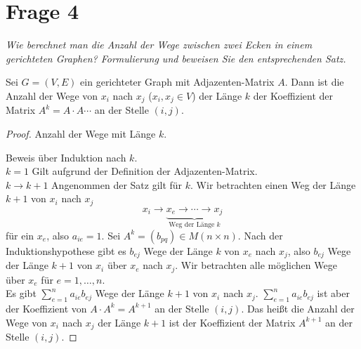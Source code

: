 \section{Frage 4}
\textit{Wie berechnet man die Anzahl der Wege zwischen zwei Ecken in
einem gerichteten Graphen? Formulierung und beweisen Sie den entsprechenden
Satz.}

\begin{theorem}
    Sei $G=(V,E)$ ein gerichteter Graph mit Adjazenten-Matrix $A$. Dann ist
    die Anzahl der Wege von $x_i$ nach $x_j$ ($x_i,x_j\in V$) der Länge $k$
    der Koeffizient der Matrix $A^k=A\cdot A \cdots$ an der Stelle $(i,j)$.
\end{theorem}

\begin{proof}
    Anzahl der Wege mit Länge $k$.

    Beweis über Induktion nach $k$.\\
    \underline{$k = 1$} Gilt aufgrund der Definition der Adjazenten-Matrix.\\
    \underline{$k \to k + 1$} Angenommen der Satz gilt für $k$. Wir betrachten
    einen Weg der Länge $k+1$ von $x_i$ nach $x_j$
    \[
        x_i \to \underbrace{x_e \to \cdots \to x_j}_{\text{Weg der Länge }k}  
    \]
    für ein $x_e$, also $a_{ie} = 1$. Sei $A^k=(b_{pq})\in M(n\times n)$.
    Nach der Induktionshypothese gibt es $b_{ej}$ Wege der Länge $k$ von 
    $x_e$ nach $x_j$, also $b_{ej}$ Wege der Länge $k+1$ von $x_i$ 
    über $x_e$ nach $x_j$. Wir betrachten alle möglichen Wege über $x_e$ für
    $e=1,\dots,n$.\\
    Es gibt $\displaystyle \sum_{e=1}^{n}a_{ie}b_{ej}$ Wege der Länge $k+1$ von $x_i$ nach
    $x_j$. $\displaystyle \sum_{e=1}^{n}a_{ie}b_{ej}$ ist aber der Koeffizient von
    $A\cdot A^k=A^{k+1}$ an der Stelle $(i,j)$. Das heißt die Anzahl der Wege
    von $x_i$ nach $x_j$ der Länge $k+1$ ist der Koeffizient der Matrix
    $A^{k+1}$ an der Stelle $(i,j)$.
\end{proof}